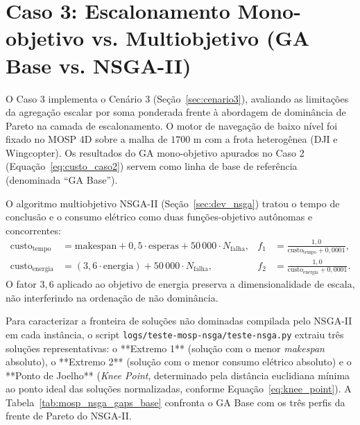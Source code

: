 \section{Caso 3: Escalonamento Mono-objetivo vs. Multiobjetivo (GA Base vs. NSGA-II)}\label{sec:caso3}

O Caso 3 implementa o Cenário 3 (Seção~\ref{sec:cenario3}), avaliando as limitações da agregação escalar por soma ponderada frente à abordagem de dominância de Pareto na camada de escalonamento. O motor de navegação de baixo nível foi fixado no MOSP 4D sobre a malha de $1700\text{ m}$ com a frota heterogênea (DJI e Wingcopter). Os resultados do GA mono-objetivo apurados no Caso 2 (Equação~\eqref{eq:custo_caso2}) servem como linha de base de referência (denominada ``GA Base'').

O algoritmo multiobjetivo NSGA-II (Seção~\ref{sec:dev_nsga}) tratou o tempo de conclusão e o consumo elétrico como duas funções-objetivo autônomas e concorrentes:
\begin{align}
\text{custo}_{\text{tempo}} &= \text{makespan} + 0{,}5 \cdot \text{esperas} + 50\,000 \cdot N_{\text{falha}}, & f_1 &= \frac{1{,}0}{\text{custo}_{\text{tempo}} + 0{,}0001}, \label{eq:f1_caso3} \\
\text{custo}_{\text{energia}} &= (3{,}6 \cdot \text{energia}) + 50\,000 \cdot N_{\text{falha}}, & f_2 &= \frac{1{,}0}{\text{custo}_{\text{energia}} + 0{,}0001}. \label{eq:f2_caso3}
\end{align}
O fator $3{,}6$ aplicado ao objetivo de energia preserva a dimensionalidade de escala, não interferindo na ordenação de não dominância.

Para caracterizar a fronteira de soluções não dominadas compilada pelo NSGA-II em cada instância, o script \texttt{logs/teste-mosp-nsga/teste-nsga.py} extraiu três soluções representativas: o **Extremo 1** (solução com o menor \textit{makespan} absoluto), o **Extremo 2** (solução com o menor consumo elétrico absoluto) e o **Ponto de Joelho** (\textit{Knee Point}, determinado pela distância euclidiana mínima ao ponto ideal das soluções normalizadas, conforme Equação~\eqref{eq:knee_point}). A Tabela~\ref{tab:mosp_nsga_gaps_base} confronta o GA Base com os três perfis da frente de Pareto do NSGA-II.

